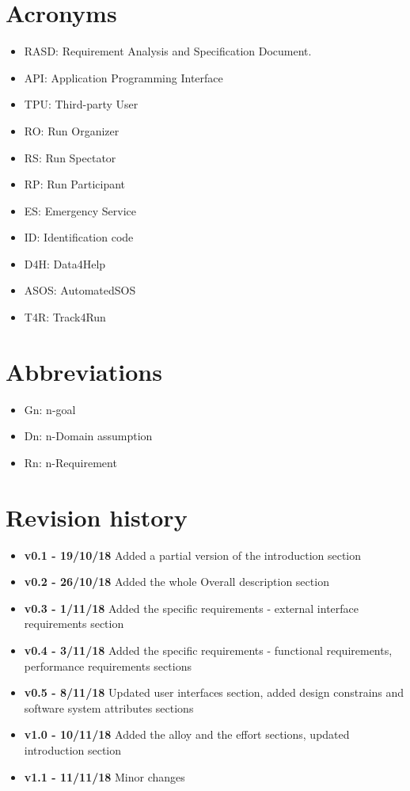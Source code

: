 \section{Acronyms}
\begin{itemize}
\item RASD: Requirement Analysis and Specification Document. 
\item API: Application Programming Interface
\item TPU: Third-party User
\item RO: Run Organizer 
\item	RS: Run Spectator 
\item	RP: Run Participant 
\item	ES: Emergency Service 
\item	ID: Identification code
\item	D4H: Data4Help
\item	ASOS: AutomatedSOS
\item	T4R: Track4Run
\end{itemize}

\section{Abbreviations}
\begin{itemize}
\item Gn: n-goal
\item Dn: n-Domain assumption
\item Rn: n-Requirement
\end{itemize}

\section{Revision history}
\begin{itemize}
\item \textbf{v0.1 - 19/10/18} Added a partial version of the introduction section
\item \textbf{v0.2 - 26/10/18} Added the whole Overall description section
\item \textbf{v0.3 - 1/11/18} Added the specific requirements - external interface requirements section 
\item \textbf{v0.4 - 3/11/18} Added the specific requirements - functional requirements, performance requirements sections
\item \textbf{v0.5 - 8/11/18} Updated user interfaces section, added design constrains and software system attributes sections
\item \textbf{v1.0 - 10/11/18} Added the alloy and the effort sections, updated introduction section 
\item \textbf{v1.1 - 11/11/18} Minor changes
\end{itemize}
